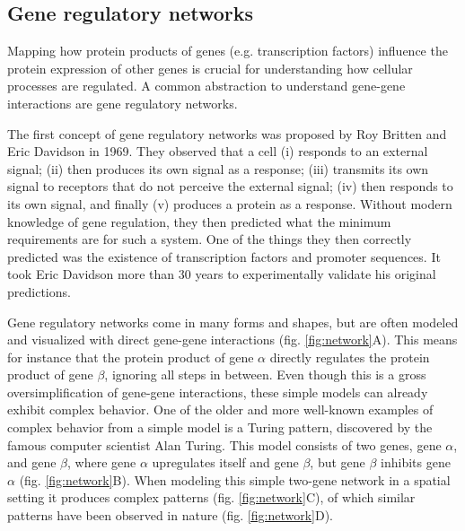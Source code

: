 \subsection{Gene regulatory networks}

Mapping how protein products of genes (e.g. transcription factors) influence the protein expression of other genes is crucial for understanding how cellular processes are regulated. A common abstraction to understand gene-gene interactions are gene regulatory networks.

The first concept of gene regulatory networks was proposed by Roy Britten and Eric Davidson in 1969\cite{Britten_1969}. They observed that a cell (i) responds to an external signal; (ii) then produces its own signal as a response; (iii) transmits its own signal to receptors that do not perceive the external signal; (iv) then responds to its own signal, and finally (v) produces a protein as a response. Without modern knowledge of gene regulation, they then predicted what the minimum requirements are for such a system. One of the things they then correctly predicted was the existence of transcription factors and promoter sequences. It took Eric Davidson more than 30 years to experimentally validate his original predictions\cite{Davidson_2002}.

Gene regulatory networks come in many forms and shapes, but are often modeled and visualized with direct gene-gene interactions (fig. \ref{fig:network}A). This means for instance that the protein product of gene $\alpha$ directly regulates the protein product of gene $\beta$, ignoring all steps in between. Even though this is a gross oversimplification of gene-gene interactions, these simple models can already exhibit complex behavior. One of the older and more well-known examples of complex behavior from a simple model is a Turing pattern, discovered by the famous computer scientist Alan Turing\cite{Turing1952}. This model consists of two genes, gene $\alpha$, and gene $\beta$, where gene $\alpha$ upregulates itself and gene $\beta$, but gene $\beta$ inhibits gene $\alpha$ (fig. \ref{fig:network}B). When modeling this simple two-gene network in a spatial setting it produces complex patterns (fig. \ref{fig:network}C), of which similar patterns have been observed in nature (fig. \ref{fig:network}D).

